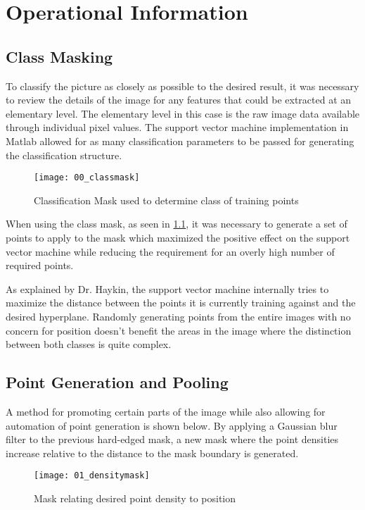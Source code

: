 \chapter{Operational Information}

\section{Class Masking}

To classify the picture as closely as possible to the desired result, it was necessary to review the details of the image for any features that could be extracted at an elementary level. The elementary level in this case is the raw image data available through individual pixel values. The support vector machine implementation in Matlab allowed for as many classification parameters to be passed for generating the classification structure. 

\begin{figure}[ht]
    \centering
    \texttt{[image: 00\_classmask]}
    \caption{Classification Mask used to determine class of training points}
    \label{fig:00_classmask}
\end{figure}

When using the class mask, as seen in \ref{fig:00_classmask}, it was necessary to generate a set of points to apply to the mask which maximized the positive effect on the support vector machine while reducing the requirement for an overly high number of required points. 

As explained by Dr. Haykin, the support vector machine internally tries to maximize the distance between the points it is currently training against and the desired hyperplane\citep{SH_hyperplane0}. Randomly generating points from the entire images with no concern for position doesn't benefit the areas in the image where the distinction between both classes is quite complex. 

\section{Point Generation and Pooling}

A method for promoting certain parts of the image while also allowing for automation of point generation is shown below. By applying a Gaussian blur filter to the previous hard-edged mask, a new mask where the point densities increase relative to the distance to the mask boundary is generated.

\begin{figure}[ht]
    \centering
    \texttt{[image: 01\_densitymask]}
    \caption{Mask relating desired point density to position}
    \label{fig:01_densitymask}
\end{figure}

